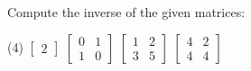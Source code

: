 \begin{exercise}
Compute the inverse of the given matrices:
\begin{tasks}(4)
\task
$\begin{bmatrix}
2
\end{bmatrix}$
\task
$\begin{bmatrix}
0 & 1 \\
1 & 0
\end{bmatrix}$
\task
$\begin{bmatrix}
1 & 2 \\
3 & 5
\end{bmatrix}$
\task
$\begin{bmatrix}
4 & 2 \\
4 & 4
\end{bmatrix}$
\end{tasks}
\end{exercise}

